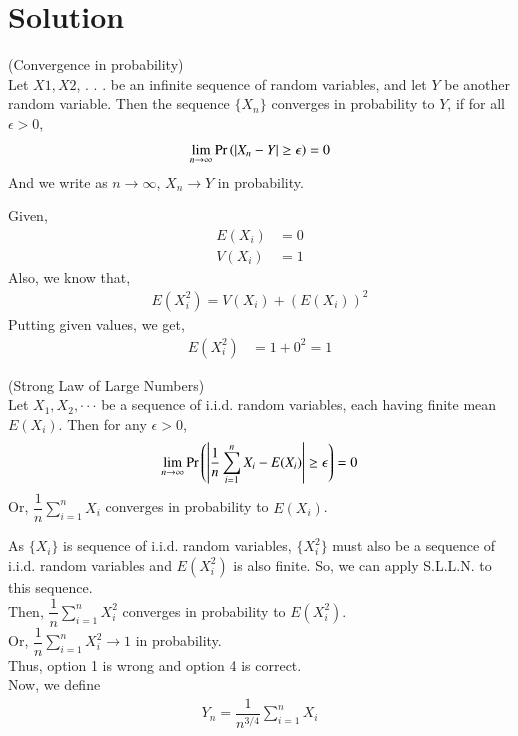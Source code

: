 \documentclass[journal,12pt,twocolumn]{IEEEtran}
\begin{document}
\section{Solution}
\begin{definition}
    (Convergence in probability)\\
    Let $X1, X2$, . . . be an infinite sequence of random variables, and let $Y$ be another random variable. Then the sequence $\{X_n\}$ converges in probability to $Y$, if for all $\epsilon >0$, 
    \begin{align}
        \lim_{n \to \infty}\Pr\left(|X_n-Y|\geq \epsilon\right)=0
    \end{align}
And we write as $n \to \infty$, $X_n \to Y$ in probability.
\end{definition}
Given,
\begin{align} 
    E(X_i)&=0 
    \label{a}\\
    V(X_i)&=1
    \label{b}
\end{align}
Also, we know that,
\begin{align}
    E(X_i^2)=V(X_i)+(E(X_i))^2
\end{align}
Putting given values, we get,
\begin{align} \label{c}
    E(X_i^2)&=1+0^2=1
\end{align}
\begin{theorem}
    (Strong Law of Large Numbers)\\
    Let $X_1, X_2, \cdot \cdot \cdot$ be a sequence of i.i.d. random variables, each having finite mean $E(X_i)$. Then for any $\epsilon >0$,
    \begin{align}
        \lim_{n \to \infty}\Pr\left(\left|\dfrac{1}{n}\sum_{i=1}^nX_i - E(X_i)\right|\geq \epsilon\right)=0
    \end{align}
    Or, $\dfrac{1}{n}\sum_{i=1}^nX_i$ converges in probability to $E(X_i)$.
\end{theorem}
As $\{X_i\}$ is sequence of i.i.d. random variables, $\{X_i^2\}$ must also be a sequence of i.i.d. random variables and $E(X_i^2)$ is also finite.
So, we can apply S.L.L.N. to this sequence.\\
Then, $\dfrac{1}{n}\sum_{i=1}^nX_i^2$ converges in probability to $E(X_i^2)$.\\
Or, $\dfrac{1}{n}\sum_{i=1}^nX_i^2 \to 1$ in probability.\\
Thus, option 1 is wrong and option 4 is correct.
\vspace{0.3cm}\\
Now, we define
\begin{align}
    Y_n=\dfrac{1}{n^{3/4}}\sum_{i=1}^nX_i
\end{align}
\end{document}
